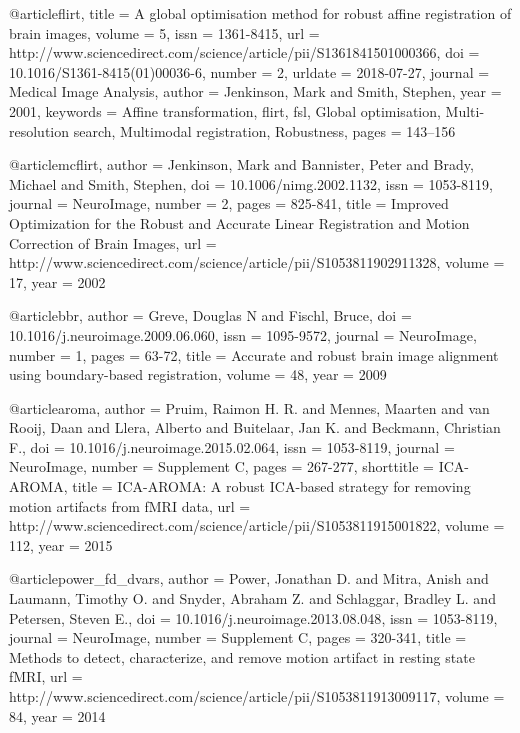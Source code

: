 @article{flirt,
    title = {A global optimisation method for robust affine registration of brain images},
    volume = {5},
    issn = {1361-8415},
    url = {http://www.sciencedirect.com/science/article/pii/S1361841501000366},
    doi = {10.1016/S1361-8415(01)00036-6},
    number = {2},
    urldate = {2018-07-27},
    journal = {Medical Image Analysis},
    author = {Jenkinson, Mark and Smith, Stephen},
    year = {2001},
    keywords = {Affine transformation, flirt, fsl, Global optimisation, Multi-resolution search, Multimodal registration, Robustness},
    pages = {143--156}
}

@article{mcflirt,
    author = {Jenkinson, Mark and Bannister, Peter and Brady, Michael and Smith, Stephen},
    doi = {10.1006/nimg.2002.1132},
    issn = {1053-8119},
    journal = {NeuroImage},
    number = 2,
    pages = {825-841},
    title = {Improved Optimization for the Robust and Accurate Linear Registration and Motion Correction of Brain Images},
    url = {http://www.sciencedirect.com/science/article/pii/S1053811902911328},
    volume = 17,
    year = 2002
}

@article{bbr,
    author = {Greve, Douglas N and Fischl, Bruce},
    doi = {10.1016/j.neuroimage.2009.06.060},
    issn = {1095-9572},
    journal = {NeuroImage},
    number = 1,
    pages = {63-72},
    title = {Accurate and robust brain image alignment using boundary-based registration},
    volume = 48,
    year = 2009
}

@article{aroma,
    author = {Pruim, Raimon H. R. and Mennes, Maarten and van Rooij, Daan and Llera, Alberto and Buitelaar, Jan K. and Beckmann, Christian F.},
    doi = {10.1016/j.neuroimage.2015.02.064},
    issn = {1053-8119},
    journal = {NeuroImage},
    number = {Supplement C},
    pages = {267-277},
    shorttitle = {ICA-AROMA},
    title = {ICA-{AROMA}: A robust {ICA}-based strategy for removing motion artifacts from fMRI data},
    url = {http://www.sciencedirect.com/science/article/pii/S1053811915001822},
    volume = 112,
    year = 2015
}

@article{power_fd_dvars,
    author = {Power, Jonathan D. and Mitra, Anish and Laumann, Timothy O. and Snyder, Abraham Z. and Schlaggar, Bradley L. and Petersen, Steven E.},
    doi = {10.1016/j.neuroimage.2013.08.048},
    issn = {1053-8119},
    journal = {NeuroImage},
    number = {Supplement C},
    pages = {320-341},
    title = {Methods to detect, characterize, and remove motion artifact in resting state fMRI},
    url = {http://www.sciencedirect.com/science/article/pii/S1053811913009117},
    volume = 84,
    year = 2014
}

